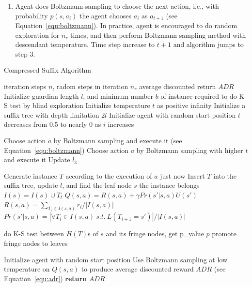 \documentclass[conference]{IEEEtran}
\begin{document}
\begin{enumerate}
		\item Agent does Boltzmann sampling to choose the next action, i.e., with
		probability $p(s, a_i)$ the agent chooses $a_i$ as $a_{t+1}$ (see Equation~\ref{equ:boltzmann}).
		In practice, agent is encouraged to do random exploration for $n_r$ times, and then perform
		Boltzmann sampling method with descendant temperature.
		Time step increase to $t+1$ and algorithm jumps to step 3.
	\end{enumerate}
	
	\begin{algorithm}[h]
		\renewcommand{\algorithmicrequire}{\textbf{Input:}}
		\renewcommand{\algorithmicensure}{\textbf{Output:}}
		\caption{Compressed Suffix Algorithm}
		\label{alg:CSM}
		\begin{algorithmic}[1]
			\REQUIRE iteration steps $n$, radom steps in iteration $n_r$
			\ENSURE average discounted return $ADR$
			\STATE Initialize guardian length $l$, and minimum number $b$ of instance required to do K-S test
			by blind exploration
			\STATE Initialize temperature $t$ as positive infinity
			\STATE Initialize a suffix tree with depth limitation $2l$
			\STATE Initialize agent with random start position
			\STATE $t$ decreases from 0.5 to nearly 0 as $i$ increases
			\ENDIF
			
			\STATE Choose action $a$ by Boltzmann sampling and execute it (see Equation~\ref{equ:boltzmann})
			\STATE Choose action $a$ by Boltzmann sampling with higher $t$ and execute it
			\STATE Update $l_3$
			\ENDIF
			\ENDWHILE
			
			\STATE Generate instance $T$ according to the execution of $a$ just now
			\STATE Insert $T$ into the suffix tree, update $l$, and find the leaf node $s$ the instance belongs
			\STATE $I(s) = I(s) \cup {T_t}$
			\STATE $Q(s,a) = R(s,a) + \gamma Pr(s'|s,a)U(s')$
			\STATE $R(s,a) = {\sum_{T_i \in I(s,a)}r_i}/{|I(s,a)|}$
			\STATE $Pr(s'|s,a) = {|\forall{T_i \in I(s,a) \ s.t. \ L(T_{i+1} = s')}|} / {|I(s,a)|}$
			
			\STATE do K-S test between $H(T)$s of $s$ and its fringe nodes, get p\_value $p$ 
			\STATE promote fringe nodes to leaves
			\ENDIF
			\ENDIF
			
			\STATE Initialize agent with random start position
			\ENDIF
			\ENDFOR
			\STATE Use Boltzmann sampling at low temperature on $Q(s, a)$ to produce average
			discounted reward $ADR$ (see Equation~\ref{equ:adr})
			\STATE \textbf{return} $ADR$
		\end{algorithmic}  
	\end{algorithm}
	
\end{document}
